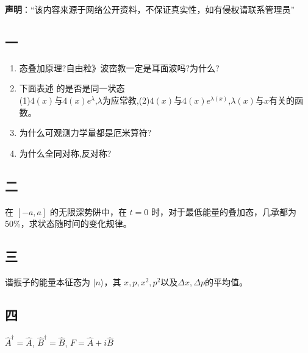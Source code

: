 
\textbf{声明}：“该内容来源于网络公开资料，不保证真实性，如有侵权请联系管理员”

\subsection{一}
\begin{enumerate}
\item 态叠加原理?自由粒》波峦教一定是耳面波吗?为什么?
\item 下面表述 的是否是同一状态\\
(1)$4(x)$与$4(x)e^\lambda$,$\lambda$为应常教,(2)$4(x)$与$4(x)e^{\lambda(x)}$,$\lambda(x)$与$x$有关的函数。
\item 为什么可观测力学量都是厄米算符?
\item 为什么全同对称,反对称?
\end{enumerate}
\subsection{二}
在 $[-a, a]$ 的无限深势阱中，在 $t=0$ 时，对于最低能量的叠加态，几承都为50\%，求状态随时间的变化规律。
\subsection{三}
谐振子的能量本征态为 $\lvert n \rangle$，其 $x,p,x^2,p^2$以及$\Delta x,\Delta p$的平均值。
\subsection{四}
 $\hat{A}^\dagger = \hat{A}$, $\hat{B}^\dagger = \hat{B}$, $F = \hat{A} + i\hat{B}$